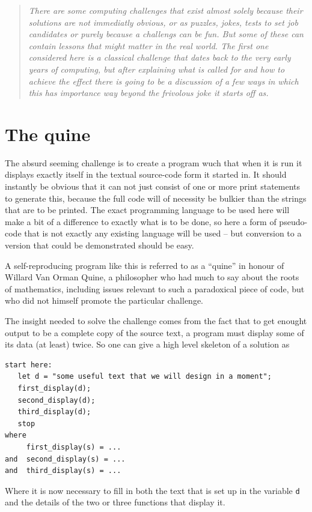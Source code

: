 \begin{quotation}\textit{
There are some computing challenges that exist almost solely because
their solutions are not immediatly obvious, or as puzzles, jokes,
tests to set job candidates or purely because a challengs can be fun.
But some of these can contain lessons that might matter in the real
world. The first one considered here is a classical challenge that dates
back to the very early years of computing, but after explaining what is
called for and how to achieve the effect there is going to be a discussion
of a few ways in which this has importance way beyond the frivolous joke it
starts off as.
}\end{quotation}

\section{The quine}
The absurd seeming challenge is to create a program wuch that when it is run
it displays exactly itself in the textual source-code form it started in.
It should instantly be obvious that it can not just consist of one or
more print statements to generate this, because the full code will of
necessity be bulkier than the strings that are to be printed. The exact
programming language to be used here will make a bit of a difference
to exactly what is to be done, so here a form of pseudo-code that is
not exactly any existing language will be used -- but conversion to
a version that could be demonstrated should be easy.

A self-reproducing program like this is referred to as a ``quine'' in
honour of Willard Van Orman Quine, a philosopher who had much to say
about the roots of mathematics, including issues relevant to such
a paradoxical piece of code, but who did not himself promote the
particular challenge.

The insight needed to solve the challenge comes from the fact that
to get enought output to be a complete copy of the source text, a
program must display some of its data (at least) twice. So one
can give a high level skeleton of a solution as
\begin{verbatim}
start here:
   let d = "some useful text that we will design in a moment";
   first_display(d);
   second_display(d);
   third_display(d);
   stop
where
     first_display(s) = ...
and  second_display(s) = ...
and  third_display(s) = ...
\end{verbatim}
Where it is now necessary to fill in both the text that is set up in
the variable \verb+d+ and the details of the two or three functions
that display it.

